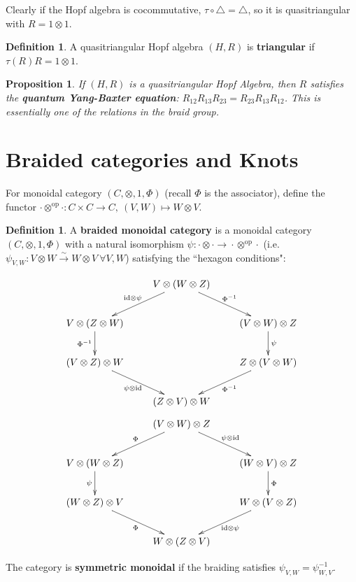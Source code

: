 \documentclass[11pt]{article}
\newcommand{\nt}{\noindent}
\newcommand{\rt}{\xrightarrow{}}
\newcommand{\xrt}{\xrightarrow}
\newcommand{\cd}{\cdot}
\newcommand{\id}{\text{id}}
\newcommand{\op}{\text{op}}
\newcommand{\define}[1]{\textbf{#1}}
\newtheorem{proposition}[lemma]{Proposition}
\theoremstyle{definition}
\newtheorem{definition}[lemma]{Definition}
\begin{document}
\nt Clearly if the Hopf algebra is cocommutative, $\tau\circ \triangle=\triangle$, so it is quasitriangular with $R=1\otimes 1$.

\begin{definition} A quasitriangular Hopf algebra $(H,R)$ is \define{triangular} if $\tau(R)R=1\otimes 1$.  
\end{definition}

\begin{proposition}If $(H,R)$ is a quasitriangular Hopf Algebra, then $R$ satisfies the \define{quantum Yang-Baxter equation}: $R_{12}R_{13}R_{23}= R_{23}R_{13}R_{12}$. This is essentially one of the relations in the braid group.
\end{proposition}

\section{Braided categories and Knots}
For monoidal category $(C,\otimes,1,\Phi)$ (recall $\Phi$ is the associator), define the functor $\cd \otimes^{\op}\cd:C\times C\rt C,\ (V,W)\mapsto W\otimes V$. 

\begin{definition} A \define{braided monoidal category} is a monoidal category $(C,\otimes,1,\Phi)$ with a natural isomorphism $\psi: \cd \otimes \cd \rt \cd \otimes^{\text{op}}\cd $ (i.e. $\psi_{V,W}:V\otimes W \xrt{\sim} W\otimes V\ \forall V,W$) satisfying the ``hexagon conditions":
\begin{useimager}
$$\xymatrix{
  & V\otimes (W\otimes Z) \ar[ld]_{\id\otimes \psi} \ar[rd]^{\Phi^{-1}} & \\
V\otimes (Z\otimes W) \ar[d]_{\Phi^{-1}} & & (V\otimes W)\otimes Z \ar[d]^{\psi}\\
(V\otimes Z)\otimes W \ar[rd]_{\psi\otimes \id} & & Z\otimes (V\otimes W) \ar[ld]^{\Phi^{-1}}\\
 & (Z\otimes V)\otimes W & \\
}$$
$$
\xymatrix{
  & (V\otimes W)\otimes Z \ar[ld]_{\Phi} \ar[rd]^{\psi\otimes \id} & \\
V\otimes (W\otimes Z) \ar[d]_{\psi} & & (W\otimes V)\otimes Z \ar[d]^{\Phi}\\
(W\otimes Z)\otimes V \ar[rd]_{\Phi} & & W\otimes (V\otimes Z) \ar[ld]^{\id\otimes \psi}\\
 & W\otimes (Z\otimes V) & \\
}
$$  
\end{useimager}

\nt The category is \define{symmetric monoidal} if the braiding satisfies $\psi_{V,W}=\psi_{W,V}^{-1}$.
\end{definition}
\end{document}
